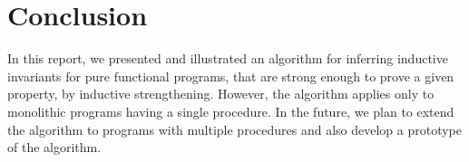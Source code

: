 \section{Conclusion} 

In this report, we presented and illustrated an algorithm for inferring inductive invariants for pure 
functional programs, that are strong enough to prove a given property, by inductive strengthening.
However, the algorithm applies only to monolithic programs having a single procedure.
In the future, we plan to extend the algorithm to programs with multiple procedures and also 
develop a prototype of the algorithm.
